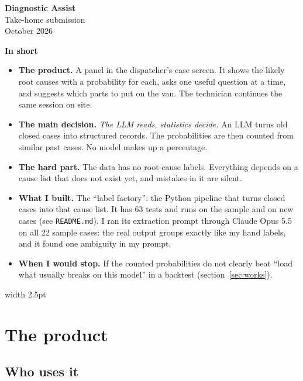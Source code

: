 \documentclass[11pt,a4paper]{article}
\newcommand{\code}[1]{\nolinkurl{#1}}
\newenvironment{callout}[1][accent]
  {\def\calloutcolor{#1}\par\smallskip\noindent
   \begin{lrbox}{\calloutbox}\begin{minipage}{\dimexpr\linewidth-2\fboxsep-11pt\relax}}
  {\end{minipage}\end{lrbox}%
   \colorbox{\calloutcolor!6}{\textcolor{\calloutcolor}{\vrule width 2.5pt}\hspace{8.5pt}\usebox{\calloutbox}}%
   \par\smallskip}
\begin{document}
\thispagestyle{empty}
\begin{center}
  {\sffamily\bfseries\fontsize{24}{28}\selectfont\color{accent}Diagnostic Assist}\\[0.5em]
  {\sffamily\large Take-home submission}\\[0.3em]
  {\sffamily\small\color{muted}October 2026}
\end{center}
\vspace{0.2em}

\begin{callout}
{\sffamily\bfseries In short}\par\smallskip
\begin{itemize}[leftmargin=1.1em]
  \item \textbf{The product.} A panel in the dispatcher's case screen. It shows the likely root causes with a probability for each, asks one useful question at a time, and suggests which parts to put on the van. The technician continues the same session on site.
  \item \textbf{The main decision.} \emph{The LLM reads, statistics decide.} An LLM turns old closed cases into structured records. The probabilities are then counted from similar past cases. No model makes up a percentage.
  \item \textbf{The hard part.} The data has no root-cause labels. Everything depends on a cause list that does not exist yet, and mistakes in it are silent.
  \item \textbf{What I built.} The “label factory”: the Python pipeline that turns closed cases into that cause list. It has 63 tests and runs on the sample and on new cases (see \code{README.md}). I ran its extraction prompt through Claude Opus 5.5 on all 22 sample cases: the real output groups exactly like my hand labels, and it found one ambiguity in my prompt.
  \item \textbf{When I would stop.} If the counted probabilities do not clearly beat “load what usually breaks on this model” in a backtest (section~\ref{sec:works}).
\end{itemize}
\end{callout}

\section{The product}\label{sec:product}

\subsection{Who uses it}
\end{document}
